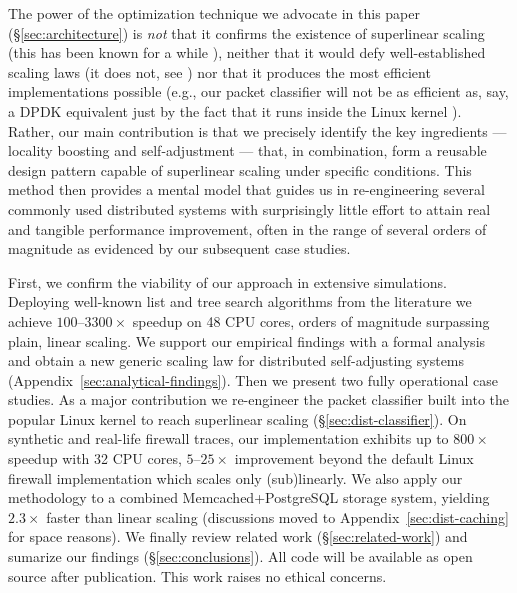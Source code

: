 The power of the optimization technique we advocate in this paper (\S\ref{sec:architecture}) is \emph{not} that it confirms the existence of superlinear scaling (this has been known for a while \cite{dobb-1, dobb-2}), neither that it would defy well-established scaling laws (it does not, see \cite{80148, gunther-hotsos, 10.1016/0167-8191(86)90024-4,10.1145/2773212.2789974}) nor that it produces the most efficient implementations possible (e.g., our packet classifier will not be as efficient as, say, a DPDK equivalent \cite{rte-acl} just by the fact that it runs inside the Linux kernel \cite{295475}). Rather, our main contribution is that we precisely identify the key ingredients --- locality boosting and self-adjustment --- that, in combination, form a reusable design pattern capable of superlinear scaling under specific conditions. This method then provides a mental model that guides us in re-engineering several commonly used distributed systems with surprisingly little effort to attain real and tangible performance improvement, often in the range of several orders of magnitude as evidenced by our subsequent case studies.

First, we confirm the viability of our approach in extensive simulations. Deploying well-known list and tree search algorithms from the literature %
we achieve $100$--$3300\times$ speedup on 48 CPU cores, orders of magnitude surpassing plain, linear scaling. We support our empirical findings with a formal analysis and obtain a new generic scaling law for distributed self-adjusting systems (Appendix~\ref{sec:analytical-findings}). Then we present two fully operational case studies. As a major contribution we re-engineer the packet classifier built into the popular Linux kernel to reach superlinear scaling (\S\ref{sec:dist-classifier}). On synthetic and real-life firewall traces, our implementation exhibits up to $800\times$ speedup with 32 CPU cores, $5$--$25\times$ improvement beyond the default Linux firewall implementation which scales only (sub)linearly. We also apply our methodology to a combined Memcached+PostgreSQL storage system, yielding $2.3\times$ faster than linear scaling (discussions moved to Appendix~\ref{sec:dist-caching} for space reasons). We finally review related work (\S\ref{sec:related-work}) and sumarize our findings (\S\ref{sec:conclusions}). All code will be available as open source after publication. This work raises no ethical concerns. 



